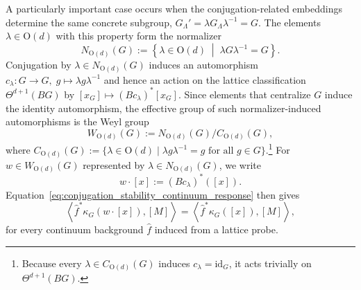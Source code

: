 \documentclass[aps,prx,reprint,superscriptaddress,twocolumn,amsmath,amssymb,amsfonts, nofootinbib]{revtex4-2}
\theoremstyle{apsstyle}
\begin{document}
A particularly important case occurs when the conjugation-related embeddings determine the same concrete subgroup, $G_{\Lambda}'=\lambda G_{\Lambda}\lambda^{-1}=G$. The elements $\lambda\in \mathrm{O}(d)$ with this property form the normalizer 
\begin{equation*} 
N_{\mathrm{O}(d)}(G) := \left\{ \lambda\in \mathrm{O}(d) \;\middle|\; \lambda G\lambda^{-1}=G \right\}. 
\end{equation*} 
Conjugation by $\lambda\in N_{\mathrm{O}(d)}(G)$ induces an automorphism $c_{\lambda}: G \to G,\; g\mapsto \lambda g\lambda^{-1}$ and hence an action on the lattice classification $\Theta^{d+1}(BG)$ by $[x_{G}]\mapsto (Bc_{\lambda})^{*}[x_{G}]$. Since elements that centralize $G$ induce the identity automorphism, the effective group of such normalizer-induced automorphisms is the Weyl group \begin{equation*} W_{\mathrm{O}(d)}(G) := N_{\mathrm{O}(d)}(G)/C_{\mathrm{O}(d)}(G), \end{equation*} where $C_{\mathrm{O}(d)}(G):=\{\lambda\in \mathrm{O}(d)\mid \lambda g\lambda^{-1}=g \text{ for all }g\in G\}$.\footnote{Because every $\lambda\in C_{\mathrm{O}(d)}(G)$ induces $c_\lambda=\mathrm{id}_G$, it acts trivially on $\Theta^{d+1}(BG)$.} For $w\in W_{\mathrm{O}(d)}(G)$ represented by $\lambda\in N_{\mathrm{O}(d)}(G)$, we write \begin{equation*} w\cdot[x] := (Bc_{\lambda})^{*}([x]). \end{equation*}
Equation~\eqref{eq:conjugation_stability_continuum_response} then gives 
\begin{equation} 
\left\langle \widehat f^{*}\kappa_G(w\cdot[x]),[M] \right\rangle = \left\langle \widehat f^{*}\kappa_G([x]),[M] \right\rangle, 
\label{eq:weyl_stability_on_probes} 
\end{equation} 
for every continuum background $\widehat f$ induced from a lattice probe. 


\medskip 
\end{document}
